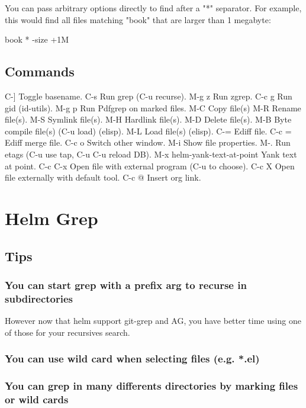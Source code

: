 \documentclass[11pt]{article}
\begin{document}
You can pass arbitrary options directly to find after a "*" separator.
For example, this would find all files matching "book" that are larger
than 1 megabyte:

book * -size +1M

\subsection{Commands}
\label{sec:org4f1fffd}

C-]		Toggle basename.
C-s		Run grep (C-u recurse).
M-g z		Run zgrep.
C-c g		Run gid (id-utils).
M-g p		Run Pdfgrep on marked files.
M-C		Copy file(s)
M-R		Rename file(s).
M-S		Symlink file(s).
M-H		Hardlink file(s).
M-D		Delete file(s).
M-B		Byte compile file(s) (C-u load) (elisp).
M-L		Load file(s) (elisp).
C-=		Ediff file.
C-c =		Ediff merge file.
C-c o		Switch other window.
M-i		Show file properties.
M-.		Run etags (C-u use tap, C-u C-u reload DB).
M-x helm-yank-text-at-point		Yank text at point.
C-c C-x		Open file with external program (C-u to choose).
C-c X		Open file externally with default tool.
C-c @		Insert org link.

\section{Helm Grep}
\label{sec:orgda3683f}

\subsection{Tips}
\label{sec:org392a076}

\subsubsection{You can start grep with a prefix arg to recurse in subdirectories}
\label{sec:orgbd6f093}
However now that helm support git-grep and AG, you have better time
using one of those for your recursives search.

\subsubsection{You can use wild card when selecting files (e.g. *.el)}
\label{sec:org44b0553}

\subsubsection{You can grep in many differents directories by marking files or wild cards}
\label{sec:org0376147}
\end{document}

